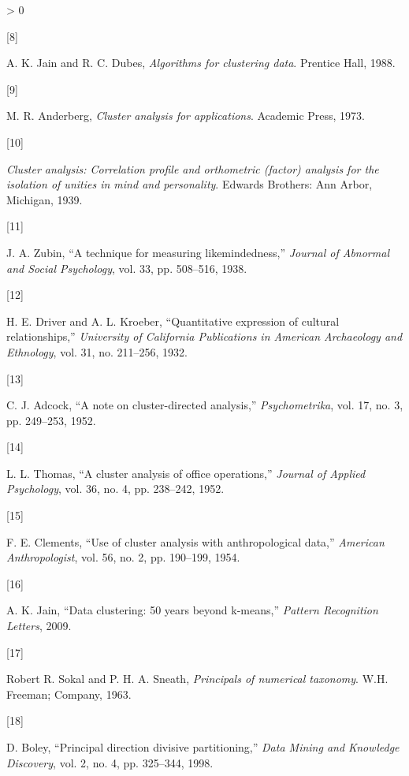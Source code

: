 \documentclass[
]{article}
\newlength{\cslhangindent}
\newlength{\csllabelwidth}
\newenvironment{CSLReferences}[3] %
 {%
  \setlength{\parindent}{0pt}
  \ifodd #1 \everypar{\setlength{\hangindent}{\cslhangindent}}\ignorespaces\fi
  \ifnum #2 > 0
  \setlength{\parskip}{#3\baselineskip}
  \fi
 }%
 {}
\newcommand{\CSLLeftMargin}[1]{\parbox[t]{\maxof{\widthof{#1}}{\csllabelwidth}}{#1}}
\newcommand{\CSLRightInline}[1]{\parbox[t]{\linewidth}{#1}}
\theoremstyle{definition}
\theoremstyle{definition}
\theoremstyle{definition}
\theoremstyle{definition}
\theoremstyle{remark}
\begin{document}
\begin{CSLReferences}{0}{0}
\leavevmode\hypertarget{ref-jainbook}{}%
\CSLLeftMargin{{[}8{]} }
\CSLRightInline{A. K. Jain and R. C. Dubes, \emph{Algorithms for clustering data}. Prentice Hall, 1988.}

\leavevmode\hypertarget{ref-anderberg}{}%
\CSLLeftMargin{{[}9{]} }
\CSLRightInline{M. R. Anderberg, \emph{Cluster analysis for applications}. Academic Press, 1973.}

\leavevmode\hypertarget{ref-1939tryon}{}%
\CSLLeftMargin{{[}10{]} }
\CSLRightInline{\emph{Cluster analysis: Correlation profile and orthometric (factor) analysis for the isolation of unities in mind and personality}. Edwards Brothers: Ann Arbor, Michigan, 1939.}

\leavevmode\hypertarget{ref-1938zubin}{}%
\CSLLeftMargin{{[}11{]} }
\CSLRightInline{J. A. Zubin, {``A technique for measuring likemindedness,''} \emph{Journal of Abnormal and Social Psychology}, vol. 33, pp. 508--516, 1938.}

\leavevmode\hypertarget{ref-1932driver}{}%
\CSLLeftMargin{{[}12{]} }
\CSLRightInline{H. E. Driver and A. L. Kroeber, {``Quantitative expression of cultural relationships,''} \emph{University of California Publications in American Archaeology and Ethnology}, vol. 31, no. 211--256, 1932.}

\leavevmode\hypertarget{ref-1952adcock}{}%
\CSLLeftMargin{{[}13{]} }
\CSLRightInline{C. J. Adcock, {``A note on cluster-directed analysis,''} \emph{Psychometrika}, vol. 17, no. 3, pp. 249--253, 1952.}

\leavevmode\hypertarget{ref-1952office}{}%
\CSLLeftMargin{{[}14{]} }
\CSLRightInline{L. L. Thomas, {``A cluster analysis of office operations,''} \emph{Journal of Applied Psychology}, vol. 36, no. 4, pp. 238--242, 1952.}

\leavevmode\hypertarget{ref-1954anthro}{}%
\CSLLeftMargin{{[}15{]} }
\CSLRightInline{F. E. Clements, {``Use of cluster analysis with anthropological data,''} \emph{American Anthropologist}, vol. 56, no. 2, pp. 190--199, 1954.}

\leavevmode\hypertarget{ref-jain50}{}%
\CSLLeftMargin{{[}16{]} }
\CSLRightInline{A. K. Jain, {``Data clustering: 50 years beyond k-means,''} \emph{Pattern Recognition Letters}, 2009.}

\leavevmode\hypertarget{ref-sokal}{}%
\CSLLeftMargin{{[}17{]} }
\CSLRightInline{Robert R. Sokal and P. H. A. Sneath, \emph{Principals of numerical taxonomy}. W.H. Freeman; Company, 1963.}

\leavevmode\hypertarget{ref-boleypddp}{}%
\CSLLeftMargin{{[}18{]} }
\CSLRightInline{D. Boley, {``Principal direction divisive partitioning,''} \emph{Data Mining and Knowledge Discovery}, vol. 2, no. 4, pp. 325--344, 1998.}


\end{CSLReferences}
\end{document}
